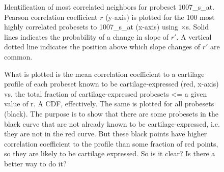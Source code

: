 \documentclass{bioinfo}
\begin{document}
\begin{figure}[!tpb]
\label{figure:cortip}
\centerline{}
\caption{Identification of most correlated neighbors for probeset 1007\_s\_at.
Pearson correlation coefficient $r$ (y-axis) is plotted for the 100 most highly
correlated probesets to 1007\_s\_at (x-axis) using $\times$s.  Solid lines
indicates the probability of a change in slope of $r\prime$.  A vertical dotted
line indicates the position above which slope changes of $r\prime$ are common.}
\end{figure}


\begin{figure}[!tpb]
\label{figure:cartilage_cdf}
\centerline{}
\caption{What is plotted is the mean correlation coefficient to a cartilage profile of
each probeset known to be cartilage-expressed (red, x-axis) vs. the total
fraction of cartilage-expressed probesets <= a given value of r.  A CDF,
effectively.  The same is plotted for all probesets (black).  The purpose is to
show that there are some probesets in the black curve that are not already
known to be cartilage-expressed, i.e. they are not in the red curve.  But these
black points have higher correlation coefficient to the profile than some
fraction of red points, so they are likely to be cartilage expressed.  So is it
clear?  Is there a better way to do it?}
\end{figure}
\end{document}
